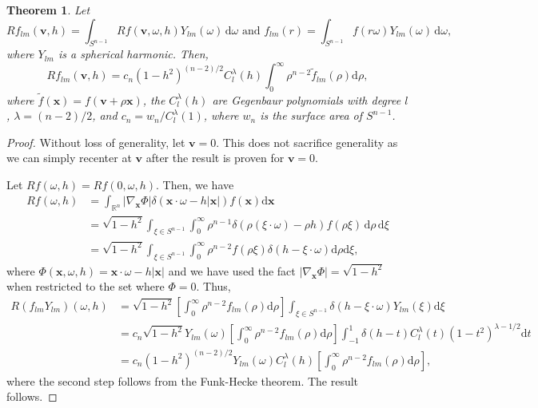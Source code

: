 \documentclass[a4paper,12pt]{amsart}
\numberwithin{equation}{section}
\theoremstyle{plain}
\newtheorem{theorem}{Theorem}
\numberwithin{theorem}{section}
\theoremstyle{definition}
\theoremstyle{remark}
\theoremstyle{remark}
\theoremstyle{remark}
\renewcommand{\d}{\,\mathrm{d}}  %
\newcommand{\vv}{{\mathbf{v}}}
\newcommand{\vx}{{\mathbf{x}}}
\begin{document}
\begin{theorem}
\label{thm_1}
Let
\[
Rf_{lm}(\vv,h) = \int_{S^{n-1}}Rf(\vv, \omega, h) Y_{lm}(\omega) \d \omega \mbox{ and } f_{lm}(r) = \int_{S^{n-1}} f(r\omega)  Y_{lm}(\omega) \d \omega,
\]
where $Y_{lm}$ is a spherical harmonic. Then,
\begin{equation}
Rf_{lm}(\vv, h) = c_n(1 - h^2)^{(n-2)/2} C^{\lambda}_l(h) \int_0^\infty \rho^{n-2} \tilde{f}_{lm}(\rho) \mathrm{d}\rho,
\end{equation}
where $\tilde{f}(\vx) = f(\vv +\rho\vx)$, the $C^{\lambda}_l(h)$ are Gegenbaur polynomials \cite{Q1983-rotation} with degree $l$, $\lambda = (n-2)/2$, and $c_n = w_n/C^{\lambda}_l(1)$, where $w_n$ is the surface area of $S^{n-1}$.
\end{theorem}
\begin{proof}
Without loss of generality, let $\vv = 0$. This does not sacrifice generality as we can simply recenter at $\vv$ after the result is proven for $\vv = 0$. 

Let $Rf(\omega, h) = Rf(0,\omega,h)$. Then, we have
\begin{equation}
\begin{split}
Rf(\omega, h)  &= \int_{\mathbb{R}^n} |\nabla_\vx\Phi| \delta( \vx\cdot \omega - h|\vx| )f(\vx) \mathrm{d}\vx\\
&= \sqrt{1 - h^2} \int_{\xi \in S^{n-1}}\int_0^\infty \rho^{n-1} \delta( \rho(\xi\cdot \omega) - \rho h)f(\rho \xi) \d \rho \d \xi\\
&= \sqrt{1 - h^2} \int_{\xi \in S^{n-1}} \int_0^\infty\rho^{n-2}  f(\rho \xi) \delta(h - \xi \cdot \omega) \mathrm{d}\rho \mathrm{d}\xi,
\end{split}
\end{equation}
where $\Phi(\vx,\omega,h) = \vx\cdot \omega - h|\vx|$ and we have used the fact $|\nabla_\vx \Phi| = \sqrt{1 - h^2}$ when restricted to the set where $\Phi = 0$. 
Thus,
\begin{equation}
\begin{split}
R(f_{lm}Y_{lm})(\omega, h)  &= \sqrt{1 - h^2}\left[\int_0^\infty\rho^{n-2}  f_{lm}(\rho) \mathrm{d}\rho \right] \int_{\xi \in S^{n-1}} \delta(h - \xi \cdot \omega) Y_{lm}(\xi) \mathrm{d}\xi \\
&= c_n\sqrt{1 - h^2}Y_{lm}(\omega)\left[\int_0^\infty\rho^{n-2}  f_{lm}(\rho) \mathrm{d}\rho \right] \int_{-1}^1 \delta(h - t) C^{\lambda}_l(t) (1 - t^2)^{\lambda - 1/2}\mathrm{d}t \\
& = c_n(1 - h^2)^{(n-2)/2} Y_{lm}(\omega) C^{\lambda}_l(h)\left[\int_0^\infty\rho^{n-2}  f_{lm}(\rho) \mathrm{d}\rho \right],
\end{split}
\end{equation}
where the second step follows from the Funk-Hecke theorem. The result follows.
\end{proof}
\end{document}

